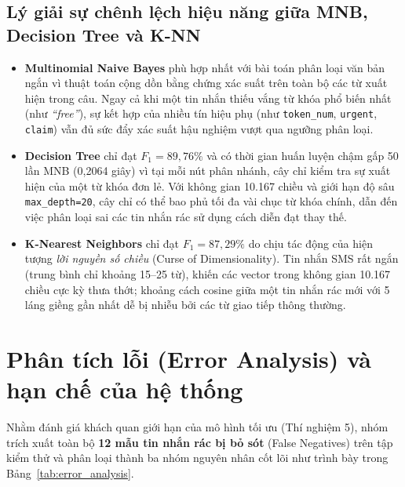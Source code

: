 \documentclass[12pt,a4paper]{report}
\begin{document}
\subsection{Lý giải sự chênh lệch hiệu năng giữa MNB, Decision Tree và K-NN}
\begin{itemize}
    \item \textbf{Multinomial Naive Bayes} phù hợp nhất với bài toán phân loại văn bản ngắn vì thuật toán cộng dồn bằng chứng xác suất trên toàn bộ các từ xuất hiện trong câu. Ngay cả khi một tin nhắn thiếu vắng từ khóa phổ biến nhất (như \textit{``free''}), sự kết hợp của nhiều tín hiệu phụ (như \texttt{token\_num}, \texttt{urgent}, \texttt{claim}) vẫn đủ sức đẩy xác suất hậu nghiệm vượt qua ngưỡng phân loại.
    \item \textbf{Decision Tree} chỉ đạt $F_1 = 89,76\%$ và có thời gian huấn luyện chậm gấp 50 lần MNB (0,2064 giây) vì tại mỗi nút phân nhánh, cây chỉ kiểm tra sự xuất hiện của một từ khóa đơn lẻ. Với không gian 10.167 chiều và giới hạn độ sâu \texttt{max\_depth=20}, cây chỉ có thể bao phủ tối đa vài chục từ khóa chính, dẫn đến việc phân loại sai các tin nhắn rác sử dụng cách diễn đạt thay thế.
    \item \textbf{K-Nearest Neighbors} chỉ đạt $F_1 = 87,29\%$ do chịu tác động của hiện tượng \textit{lời nguyền số chiều} (Curse of Dimensionality). Tin nhắn SMS rất ngắn (trung bình chỉ khoảng 15--25 từ), khiến các vector trong không gian 10.167 chiều cực kỳ thưa thớt; khoảng cách cosine giữa một tin nhắn rác mới với 5 láng giềng gần nhất dễ bị nhiễu bởi các từ giao tiếp thông thường.
\end{itemize}

\section{Phân tích lỗi (Error Analysis) và hạn chế của hệ thống}
Nhằm đánh giá khách quan giới hạn của mô hình tối ưu (Thí nghiệm 5), nhóm trích xuất toàn bộ \textbf{12 mẫu tin nhắn rác bị bỏ sót} (False Negatives) trên tập kiểm thử và phân loại thành ba nhóm nguyên nhân cốt lõi như trình bày trong Bảng~\ref{tab:error_analysis}.
\end{document}
